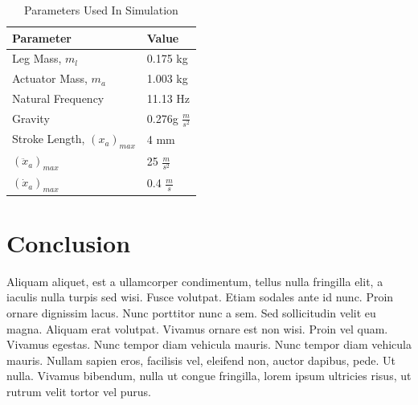 \documentclass[11pt]{article}
\begin{document}
\begin{table}
\label{table:sim_parameters}
\begin{center}
\caption{Parameters Used In Simulation}
\vspace{0.1in}
\begin{tabular}{ll}
\hline
\hline
Parameter & Value  \\
\hline
Leg Mass, $m_l$ & 0.175 kg \\
Actuator Mass, $m_a$ & 1.003 kg  \\
Natural Frequency & 11.13 Hz \\
Gravity  & 0.276g $\frac{m}{s^2}$ \\[1ex]
\hline
Stroke Length, $(x_a)_{max}$ & 4 mm \\
$(\ddot{x}_a)_{max}$ & 25 $\frac{m}{s^2}$ \\
$(\dot{x}_a)_{max}$ & 0.4 $\frac{m}{s}$ \\
\end{tabular}
\end{center}
\end{table}

\section{Conclusion}
\label{sec:conclusion}
\vspace{-0.2in}
%
Aliquam aliquet, est a ullamcorper condimentum, tellus nulla fringilla elit, a iaculis nulla turpis sed wisi. Fusce volutpat. Etiam sodales ante id nunc. Proin ornare dignissim lacus. Nunc porttitor nunc a sem. Sed sollicitudin velit eu magna. Aliquam erat volutpat. Vivamus ornare est non wisi. Proin vel quam. Vivamus egestas. Nunc tempor diam vehicula mauris. Nunc tempor diam vehicula mauris. Nullam sapien eros, facilisis vel, eleifend non, auctor dapibus, pede. Ut nulla. Vivamus bibendum, nulla ut congue fringilla, lorem ipsum ultricies risus, ut rutrum velit tortor vel purus.
\end{document}
